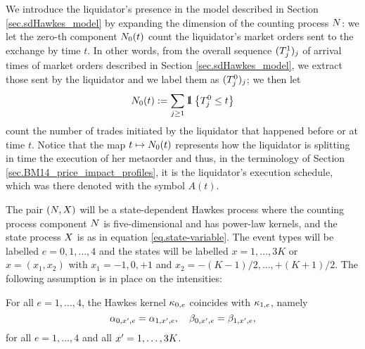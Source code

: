 \documentclass[10pt, article,table]{article}
\begin{document}
We introduce the liquidator's presence in the model described in Section \ref{sec.sdHawkes_model} by expanding the dimension of the counting process $\multiCountingProc$: we let the zero-th component $\countingProc[0](t)$ count the liquidator's market orders sent to the exchange by time $t$. In other words, from the overall sequence $(\arrivalTimes[1]_j)_j$ of arrival times of market orders described in Section \ref{sec.sdHawkes_model}, we extract those sent by the liquidator and we label them as $(\arrivalTimes[0]_j)_j$; we then let 
\begin{equation*}
 \countingProc[0](t):=\sum_{j\geq 1}\one \left\lbrace \arrivalTimes[0]_j \leq t \right\rbrace
\end{equation*}
count the number of trades initiated by the liquidator that happened before or at time $t$. Notice that the map $t\mapsto \countingProc[0](t)$ represents how the liquidator is splitting in time the execution of her metaorder and thus, in the terminology of Section \ref{sec.BM14_price_impact_profiles}, it is the liquidator's execution schedule, which was there denoted with the symbol $A(t)$.

The pair $(\multiCountingProc, \stateVariable)$ will be a state-dependent Hawkes process where the counting process component $\multiCountingProc$ is five-dimensional and has power-law kernels, and the state process $\stateVariable$ is as in equation \eqref{eq.state-variable}. The event types will be labelled $e=0,1,\dots,4$ and the states will be labelled $x=1,\dots,3K$ or $x=(x_1,x_2)$ with $x_1 = -1,0,+1$ and $x_2 = -(K-1)/2,\dots,+(K+1)/2$.  The following assumption is in place on the intensities:
\begin{assumption}\label{assumption.imp_and_dec_coef_from_liquidator}
 For all $e=1,\dots,4$, the Hawkes kernel $\hawkesKernel_{0,e}$ coincides with  $\hawkesKernel_{1,e}$, namely
 \begin{equation*}
  \impCoef_{0,\xone,e}=\impCoef_{1,\xone,e} , \quad \decCoef_{0,\xone,e}= \decCoef_{1,\xone,e}, 
 \end{equation*}
for all $e=1,\dots,4$ and all $\xone = 1,\dots, 3K$. 
\end{assumption}
\end{document}
